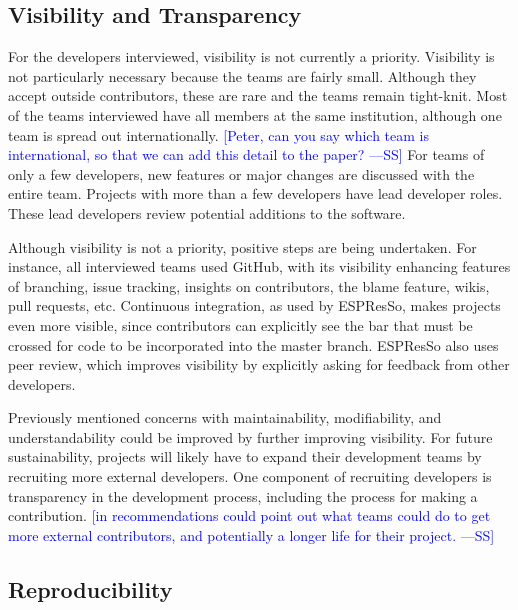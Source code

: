 \documentclass[final, 3p, times, authoryear]{elsarticle}
\newcommand{\authornote}[3]{\textcolor{#1}{[#3 ---#2]}}
\newcommand{\authornote}[3]{}
\newcommand{\wss}[1]{\authornote{blue}{SS}{#1}} %
\begin{document}
\subsection{Visibility and Transparency} \label{secVisib}

For the developers interviewed, visibility is not currently a priority.
Visibility is not particularly necessary because the teams are fairly small.
Although they accept outside contributors, these are rare and the teams remain
tight-knit.  Most of the teams interviewed have all members at the same
institution, although one team is spread out internationally. \wss{Peter, can
you say which team is international, so that we can add this detail to the
paper?}  For teams of only a few developers, new features or major changes are
discussed with the entire team. Projects with more than a few developers have
lead developer roles. These lead developers review potential additions to the
software.  

Although visibility is not a priority, positive steps are being undertaken. For
instance, all interviewed teams used GitHub, with its visibility enhancing
features of branching, issue tracking, insights on contributors, the blame
feature, wikis, pull requests, etc. Continuous integration, as used by ESPResSo,
makes projects even more visible, since contributors can explicitly see the bar
that must be crossed for code to be incorporated into the master branch.
ESPResSo also uses peer review, which improves visibility by explicitly asking
for feedback from other developers.

Previously mentioned concerns with maintainability, modifiability, and
understandability  could be improved by further improving visibility.  For
future sustainability, projects will likely have to expand their development
teams by recruiting more external developers. One component of recruiting
developers is transparency in the development process, including the process for
making a contribution.  \wss{in recommendations could point out what teams could
do to get more external contributors, and potentially a longer life for their
project.}

\subsection{Reproducibility}
\end{document}
